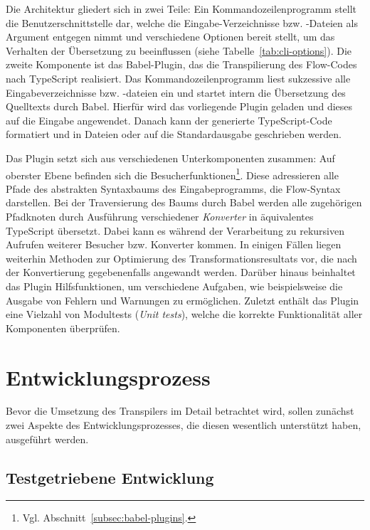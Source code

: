Die Architektur gliedert sich in zwei Teile: Ein Kommandozeilenprogramm stellt die Benutzerschnittstelle dar, welche die Eingabe-Verzeichnisse bzw. -Dateien als Argument entgegen nimmt und verschiedene Optionen bereit stellt, um das Verhalten der Übersetzung zu beeinflussen (siehe Tabelle~\ref{tab:cli-options}). Die zweite Komponente ist das Babel-Plugin, das die Transpilierung des Flow-Codes nach TypeScript realisiert. Das Kommandozeilenprogramm liest sukzessive alle Eingabeverzeichnisse bzw. -dateien ein und startet intern die Übersetzung des Quelltexts durch Babel. Hierfür wird das vorliegende Plugin geladen und dieses auf die Eingabe angewendet. Danach kann der generierte TypeScript-Code formatiert und in Dateien oder auf die Standardausgabe geschrieben werden.

Das Plugin setzt sich aus verschiedenen Unterkomponenten zusammen: Auf oberster Ebene befinden sich die Besucherfunktionen\footnote{Vgl. Abschnitt~\ref{subsec:babel-plugins}.}. Diese adressieren alle Pfade des abstrakten Syntaxbaums des Eingabeprogramms, die Flow-Syntax darstellen. Bei der Traversierung des Baums durch Babel werden alle zugehörigen Pfadknoten durch Ausführung verschiedener \emph{Konverter} in äquivalentes TypeScript übersetzt. Dabei kann es während der Verarbeitung zu rekursiven Aufrufen weiterer Besucher bzw. Konverter kommen. In einigen Fällen liegen weiterhin Methoden zur Optimierung des Transformationsresultats vor, die nach der Konvertierung gegebenenfalls angewandt werden. Darüber hinaus beinhaltet das Plugin Hilfsfunktionen, um verschiedene Aufgaben, wie beispielsweise die Ausgabe von Fehlern und Warnungen zu ermöglichen. Zuletzt enthält das Plugin eine Vielzahl von Modultests (\textit{Unit tests}), welche die korrekte Funktionalität aller Komponenten überprüfen.

\section{Entwicklungsprozess}

Bevor die Umsetzung des Transpilers im Detail betrachtet wird, sollen zunächst zwei Aspekte des Entwicklungsprozesses, die diesen wesentlich unterstützt haben, ausgeführt werden.

\subsection{Testgetriebene Entwicklung}

